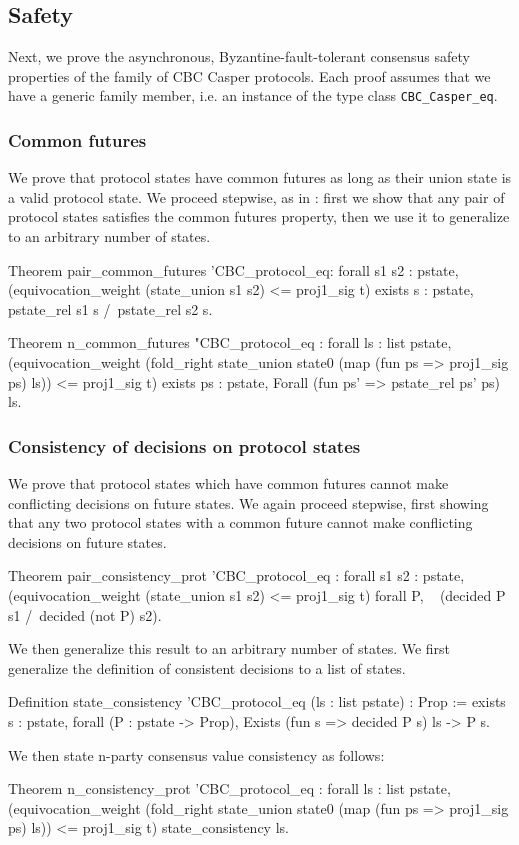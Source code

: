 \documentclass[runningheads]{llncs}
\begin{document}
\subsection{Safety} 
Next, we prove the asynchronous, Byzantine-fault-tolerant consensus safety properties of the family of CBC Casper protocols. Each proof assumes that we have a generic family member, i.e. an instance of the type class \verb|CBC_Casper_eq|. 
\subsubsection{Common futures} 
We prove that protocol states have common futures as long as their union state is a valid protocol state. We proceed stepwise, as in \cite{CBCfull}: first we show that any pair of protocol states satisfies the common futures property, then we use it to generalize to an arbitrary number of states. 
\begin{coq}
Theorem pair_common_futures '{CBC_protocol_eq}:
	forall s1 s2 : pstate,
	(equivocation_weight (state_union s1 s2) <= proj1_sig t)%
	exists s : pstate, pstate_rel s1 s /\ pstate_rel s2 s.
	
Theorem n_common_futures "{CBC_protocol_eq} :
	forall ls : list pstate,
	(equivocation_weight (fold_right state_union state0 (map (fun ps => proj1_sig ps) ls)) 
	<= proj1_sig t)%
	exists ps : pstate, Forall (fun ps' => pstate_rel ps' ps) ls.
\end{coq}	

\subsubsection{Consistency of decisions on protocol states}
We prove that protocol states which have common futures cannot make conflicting decisions on future states. We again proceed stepwise, first showing that any two protocol states with a common future cannot make conflicting decisions on future states. 
\begin{coq}
Theorem pair_consistency_prot '{CBC_protocol_eq} :
	forall s1 s2 : pstate,
	(equivocation_weight (state_union s1 s2) <= proj1_sig t)%
	forall P, 
	~ (decided P s1 /\ decided (not P) s2).
\end{coq}
We then generalize this result to an arbitrary number of states. We first generalize the definition of consistent decisions to a list of states. 
\begin{coq}
Definition state_consistency '{CBC_protocol_eq} 
															(ls : list pstate) : Prop :=
	exists s : pstate,
	forall (P : pstate -> Prop),
	Exists (fun s => decided P s) ls ->
	P s.
\end{coq}
We then state n-party consensus value consistency as follows: 
\begin{coq}
Theorem n_consistency_prot '{CBC_protocol_eq} :
	forall ls : list pstate,
	(equivocation_weight (fold_right state_union state0 
	(map (fun ps => proj1_sig ps) ls)) <= proj1_sig t)%
	state_consistency ls.
\end{coq}
\end{document}
